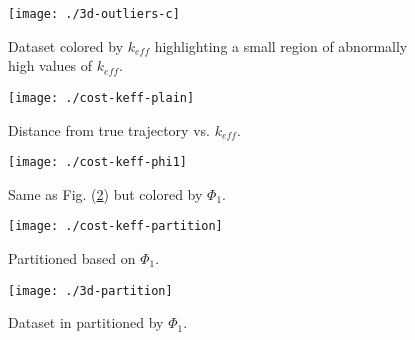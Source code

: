 \documentclass[11pt]{article}
\begin{document}
\begin{figure}[htbp]
  \centering
  \texttt{[image: ./3d-outliers-c]}
  \caption{Dataset colored by $k_{eff}$ highlighting a small region of
    abnormally high values of $k_{eff}$. \label{figk}}
\end{figure}


\begin{figure}[htbp]
  \centering
  \texttt{[image: ./cost-keff-plain]}
  \caption{Distance from true trajectory vs. $k_{eff}$. \label{fignc}}
\end{figure}


\begin{figure}[htbp]
  \centering
  \texttt{[image: ./cost-keff-phi1]}
  \caption{Same as Fig. (\ref{fignc}) but colored by $\Phi_1$. \label{figc}}
\end{figure}


\begin{figure}[htbp]
  \centering
  \texttt{[image: ./cost-keff-partition]}
  \caption{Partitioned based on $\Phi_1$. \label{figrb}}
\end{figure}


\begin{figure}[htbp]
  \centering
  \texttt{[image: ./3d-partition]}
  \caption{Dataset in partitioned by $\Phi_1$. \label{fig3dc}}
\end{figure}
\end{document}
